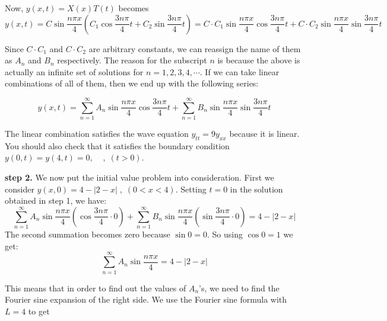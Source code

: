 \documentclass[12pt]{report}
\begin{document}
Now, $y(x,t) = X(x) T(t) $ becomes
$$ y(x,t) =  C \sin\frac{n\pi x}{4} \left( C_1 \cos \frac{3n\pi}{4} t + C_2 \sin \frac{3n\pi}{4} t \right) =  C\cdot C_1 \sin\frac{n\pi x}{4} \cos \frac{3n\pi}{4} t + C\cdot C_2 \sin\frac{n\pi x}{4} \sin \frac{3n\pi}{4} t $$

Since $C\cdot C_1$ and $C\cdot C_2$ are arbitrary constants, we can reassign the name of them as $A_n$ and $B_n$ respectively. The reason for the subscript $n$ is because the above is actually an infinite set of solutions for $n=1,2,3,4,\cdots$. If we can take linear combinations of all of them, then we end up with the following series:

$$ y(x,t) = \sum_{n=1}^{\infty} A_n \sin\frac{n\pi x}{4} \cos \frac{3n\pi}{4} t + \sum_{n=1}^{\infty} B_n \sin\frac{n\pi x}{4} \sin \frac{3n\pi}{4} t $$

The linear combination satisfies the wave equation $ y_{tt} = 9 y_{xx}$ because it is linear. You should also check that it satisfies the boundary condition $ y(0,t) = y(4,t)=0, \; \; \; \;,  \; ( t>0) $.

\textbf{step 2.} We now put the initial value problem into consideration. First we consider $ y(x,0) = 4 - |2-x| \;,  \; (0<x<4) $. Setting $t=0$ in the solution obtained in step 1, we have:
$$ \sum_{n=1}^{\infty} A_n \sin\frac{n\pi x}{4} \left( \cos \frac{3n\pi}{4} \cdot 0 \right) + \sum_{n=1}^{\infty} B_n \sin\frac{n\pi x}{4} \left( \sin \frac{3n\pi}{4} \cdot 0 \right) = 4 - |2-x| $$
The second summation becomes zero because $\sin 0 =0$. So using $\cos 0 =1$ we get:
$$ \sum_{n=1}^{\infty} A_n \sin\frac{n\pi x}{4} = 4 - |2-x| $$

This means that in order to find out the values of $A_n$'s, we need to find the Fourier sine expansion of the right side. We use the Fourier sine formula with $L=4$ to get
\end{document}
